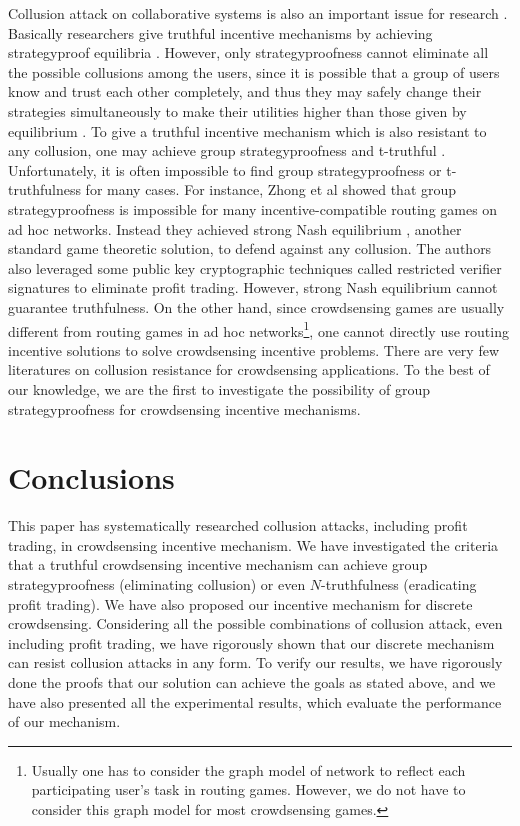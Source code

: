 \documentclass[conference]{IEEEtran}
\theoremstyle{definition}
\begin{document}
Collusion attack on collaborative systems is also an important issue for research \cite{feng2013imac, chen2013sparc, zhong2007designing, zheng2014strategy}. Basically researchers give truthful incentive mechanisms by achieving strategyproof equilibria \cite{feng2013imac}. However, only strategyproofness cannot eliminate all the possible collusions among the users, since it is possible that a group of users know and trust each other completely, and thus they may safely change their strategies simultaneously to make their utilities higher than those given by equilibrium \cite{goldberg2005collusion, zhong2007designing}. To give a truthful incentive mechanism which is also resistant to any collusion, one may achieve group strategyproofness \cite{jain1999group, mas1995microeconomic} and t-truthful \cite{goldberg2005collusion,goldberg2003competitiveness}. Unfortunately, it is often impossible to find group strategyproofness or t-truthfulness for many cases. For instance, Zhong et al \cite{zhong2007designing} showed that group strategyproofness is impossible for many incentive-compatible routing games on ad hoc networks. Instead they achieved strong Nash equilibrium \cite{aumann1959acceptable, mas1995microeconomic}, another standard game theoretic solution, to defend against any collusion. The authors also leveraged some public key cryptographic techniques called restricted verifier signatures to eliminate profit trading. However, strong Nash equilibrium cannot guarantee truthfulness. On the other hand, since crowdsensing games are usually different from routing games in ad hoc networks\footnote{Usually one has to consider the graph model of network to reflect each participating user's task in routing games. However, we do not have to consider this graph model for most crowdsensing games.}, one cannot directly use routing incentive solutions to solve crowdsensing incentive problems. There are very few literatures on collusion resistance for crowdsensing applications. To the best of our knowledge, we are the first to investigate the possibility of group strategyproofness for crowdsensing incentive mechanisms.

\section{Conclusions}
\label{sec:con}
This paper has systematically researched collusion attacks, including profit trading, in crowdsensing incentive mechanism. We have investigated the criteria that a truthful crowdsensing incentive mechanism can achieve group strategyproofness (eliminating collusion) or even $N$-truthfulness (eradicating profit trading). We have also proposed our incentive mechanism for discrete crowdsensing. {\color{blue}Considering all the possible combinations of collusion attack, even including profit trading, we have rigorously shown that our discrete mechanism can resist collusion attacks in any form.} To verify our results, we have rigorously done the proofs that our solution can achieve the goals as stated above, and we have also presented all the experimental results, {\color{blue}which evaluate the performance of our mechanism.}
\end{document}
